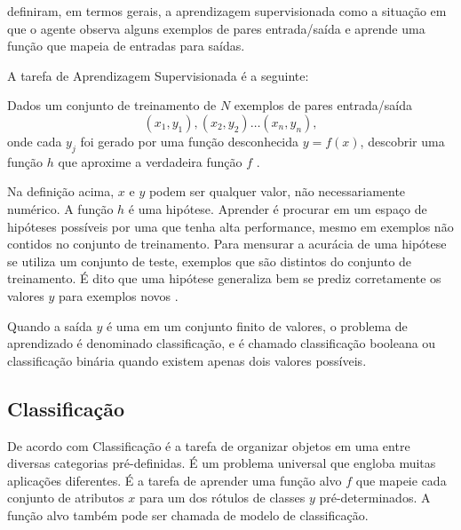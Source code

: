  definiram, em termos gerais, a aprendizagem
supervisionada como a situação em que o agente observa alguns exemplos de pares
entrada/saída e aprende uma função que mapeia de entradas para saídas.

A tarefa de Aprendizagem Supervisionada é a seguinte:

Dados um conjunto de treinamento de \(N\) exemplos de pares entrada/saída
\[ (x_1,y_1),(x_2,y_2)\ldots(x_n,y_n), \]
onde cada \(y_j\) foi gerado por uma função desconhecida \(y = f(x)\), descobrir
uma função \(h\) que aproxime a verdadeira função \(f\)
\cite{russell2011artificial}.

Na definição acima, \(x\) e \(y\) podem ser qualquer valor, não necessariamente
numérico. A função \(h\) é uma hipótese. Aprender é procurar em um espaço de
hipóteses possíveis por uma que tenha alta performance, mesmo em exemplos não
contidos no conjunto de treinamento. Para mensurar a acurácia de uma hipótese se
utiliza um conjunto de teste, exemplos que são distintos do conjunto de
treinamento. É dito que uma hipótese generaliza bem se prediz corretamente os
valores \(y\) para exemplos novos \cite{russell2011artificial}.

Quando a saída \(y\) é uma em um conjunto finito de valores, o problema de
aprendizado é denominado classificação, e é chamado classificação booleana ou
classificação binária quando existem apenas dois valores
possíveis\cite{russell2011artificial}.

\subsection{Classificação}

De acordo com  Classificação é a tarefa de
organizar objetos em uma entre diversas categorias pré-definidas. É um problema
universal que engloba muitas aplicações diferentes. É a tarefa de aprender uma
função alvo \(f\) que mapeie cada conjunto de atributos \(x\) para um dos
rótulos de classes \(y\) pré-determinados. A função alvo também pode ser chamada
de modelo de classificação.


